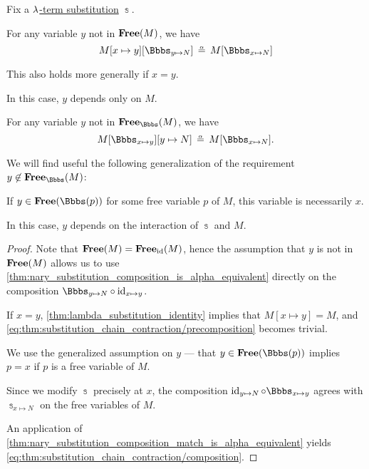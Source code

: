 \begin{corollary}\label{thm:substitution_chain_contraction}
  Fix a \hyperref[def:lambda_term_substitution]{\( {\mathrm \lambda} \)-term substitution} \( \Bbbs \).

  \begin{thmenum}
     For any variable \( y \) not in \( \op*{Free}(M) \), we have
    \begin{equation}\label{eq:thm:substitution_chain_contraction/precomposition}
      M[x \mapsto y][\Bbbs_{y \mapsto N}]
      \aequiv
      M[\Bbbs_{x \mapsto N}]
    \end{equation}

    This also holds more generally if \( x = y \).

    In this case, \( y \) depends only on \( M \).

     For any variable \( y \) not in \( \op*{Free}_\Bbbs(M) \), we have
    \begin{equation}\label{eq:thm:substitution_chain_contraction/composition}
      M[\Bbbs_{x \mapsto y}][y \mapsto N]
      \aequiv
      M[\Bbbs_{x \mapsto N}].
    \end{equation}

    We will find useful the following generalization of the requirement \( y \not\in \op*{Free}_\Bbbs(M) \):
    \begin{displayquote}
      If \( y \in \op*{Free}(\Bbbs(p)) \) for some free variable \( p \) of \( M \), this variable is necessarily \( x \).
    \end{displayquote}

    In this case, \( y \) depends on the interaction of \( \Bbbs \) and \( M \).
  \end{thmenum}
\end{corollary}
\begin{proof}
   Note that \( \op*{Free}(M) = \op*{Free}_{\id}(M) \), hence the assumption that \( y \) is not in \( \op*{Free}(M) \) allows us to use \cref{thm:nary_substitution_composition_is_alpha_equivalent} directly on the composition \( \Bbbs_{y \mapsto N} \bincirc \id_{x \mapsto y} \).

  If \( x = y \), \cref{thm:lambda_substitution_identity} implies that \( M[x \mapsto y] = M \), and \eqref{eq:thm:substitution_chain_contraction/precomposition} becomes trivial.

   We use the generalized assumption on \( y \) --- that \( y \in \op*{Free}(\Bbbs(p)) \) implies \( p = x \) if \( p \) is a free variable of \( M \).

  Since we modify \( \Bbbs \) precisely at \( x \), the composition \( \id_{y \mapsto N} \bincirc \Bbbs_{x \mapsto y} \) agrees with \( \Bbbs_{x \mapsto N} \) on the free variables of \( M \).

  An application of \cref{thm:nary_substitution_composition_match_is_alpha_equivalent} yields \eqref{eq:thm:substitution_chain_contraction/composition}.
\end{proof}

